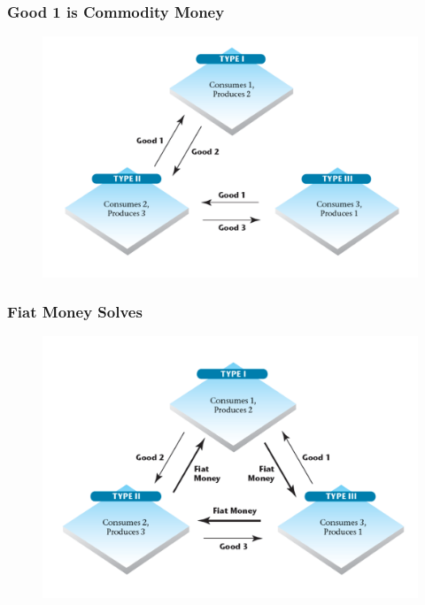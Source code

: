 \documentclass{beamer}
\begin{document}
\begin{frame}
\frametitle[alignment=center]{Good 1 is Commodity Money}
\begin{figure}
\centering
\includegraphics[scale=0.6]{Figures/W_Fig_18pt2.png}
\end{figure}
\end{frame}

\begin{frame}
\frametitle[alignment=center]{Fiat Money Solves}
\begin{figure}
\centering
\includegraphics[scale=0.6]{Figures/W_Fig_18pt3.png}
\end{figure}
\end{frame}
\end{document}

